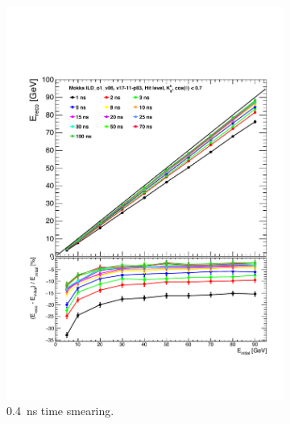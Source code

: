 \begin{figure}[t]
  \centering
  \begin{minipage}{1\textwidth}
    \begin{subfigure}[t]{0.5\textwidth}
      \centering
      \includegraphics[width=1\linewidth]{chap6/fig_TimingILD/0.4ns_Smearing/Linearity_TimeCuts_Smearing0.4ns}
      \vspace{-6ex}
      \caption{\SI{0.4}{\nano\second} time smearing.} \label{fig:Lin0.4ns}
    \end{subfigure}
    \begin{subfigure}[t]{0.5\textwidth}
      \centering

\end{subfigure}
\end{minipage}
\end{figure}
